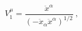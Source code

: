 \begin{equation} \label{l81-3}
V_{1}^{\mu}=\frac{{\ddot x}^{\alpha}}{(-\ddot x_{\alpha}\ddot x^{\alpha})^{1/2}}~,
\end{equation}

